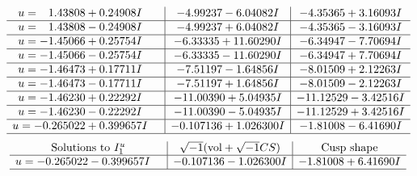 \documentclass[1p]{elsarticle_modified}
\theoremstyle{definition}
\newcommand{\I}{\sqrt{-1}}
\begin{document}
$$\begin{array}{c|c|c}
\begin{aligned}
u &= \phantom{-}1.43808 + 0.24908 I\end{aligned}
 & -4.99237 - 6.04082 I & -4.35365 + 3.16093 I \\ \hline\begin{aligned}
u &= \phantom{-}1.43808 - 0.24908 I\end{aligned}
 & -4.99237 + 6.04082 I & -4.35365 - 3.16093 I \\ \hline\begin{aligned}
u &= -1.45066 + 0.25754 I\end{aligned}
 & -6.33335 + 11.60290 I & -6.34947 - 7.70694 I \\ \hline\begin{aligned}
u &= -1.45066 - 0.25754 I\end{aligned}
 & -6.33335 - 11.60290 I & -6.34947 + 7.70694 I \\ \hline\begin{aligned}
u &= -1.46473 + 0.17711 I\end{aligned}
 & -7.51197 - 1.64856 I & -8.01509 + 2.12263 I \\ \hline\begin{aligned}
u &= -1.46473 - 0.17711 I\end{aligned}
 & -7.51197 + 1.64856 I & -8.01509 - 2.12263 I \\ \hline\begin{aligned}
u &= -1.46230 + 0.22292 I\end{aligned}
 & -11.00390 + 5.04935 I & -11.12529 - 3.42516 I \\ \hline\begin{aligned}
u &= -1.46230 - 0.22292 I\end{aligned}
 & -11.00390 - 5.04935 I & -11.12529 + 3.42516 I \\ \hline\begin{aligned}
u &= -0.265022 + 0.399657 I\end{aligned}
 & -0.107136 + 1.026300 I & -1.81008 - 6.41690 I\\
 \hline 
 \end{array}$$\newpage$$\begin{array}{c|c|c}  
\text{Solutions to }I^u_{1}& \I (\text{vol} + \sqrt{-1}CS) & \text{Cusp shape}\\
 \hline 
\begin{aligned}
u &= -0.265022 - 0.399657 I\end{aligned}
 & -0.107136 - 1.026300 I & -1.81008 + 6.41690 I\\
 \hline 
 \end{array}$$\newpage
\end{document}

